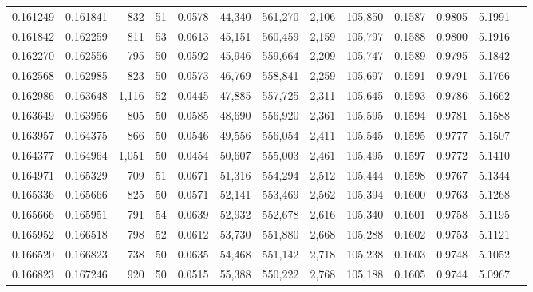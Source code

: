 \begin{tabular}{rrrrrrrrrrrrr}
0.161249 & 0.161841 &   832 &  51 &                                     0.0578 &  44,340 & 561,270 &   2,106 & 105,850 & 0.1587 & 0.9805 & 5.1991 \\
0.161842 & 0.162259 &   811 &  53 &                                     0.0613 &  45,151 & 560,459 &   2,159 & 105,797 & 0.1588 & 0.9800 & 5.1916 \\
0.162270 & 0.162556 &   795 &  50 &                                     0.0592 &  45,946 & 559,664 &   2,209 & 105,747 & 0.1589 & 0.9795 & 5.1842 \\
0.162568 & 0.162985 &   823 &  50 &                                     0.0573 &  46,769 & 558,841 &   2,259 & 105,697 & 0.1591 & 0.9791 & 5.1766 \\
0.162986 & 0.163648 & 1,116 &  52 &                                     0.0445 &  47,885 & 557,725 &   2,311 & 105,645 & 0.1593 & 0.9786 & 5.1662 \\
0.163649 & 0.163956 &   805 &  50 &                                     0.0585 &  48,690 & 556,920 &   2,361 & 105,595 & 0.1594 & 0.9781 & 5.1588 \\
0.163957 & 0.164375 &   866 &  50 &                                     0.0546 &  49,556 & 556,054 &   2,411 & 105,545 & 0.1595 & 0.9777 & 5.1507 \\
0.164377 & 0.164964 & 1,051 &  50 &                                     0.0454 &  50,607 & 555,003 &   2,461 & 105,495 & 0.1597 & 0.9772 & 5.1410 \\
0.164971 & 0.165329 &   709 &  51 &                                     0.0671 &  51,316 & 554,294 &   2,512 & 105,444 & 0.1598 & 0.9767 & 5.1344 \\
0.165336 & 0.165666 &   825 &  50 &                                     0.0571 &  52,141 & 553,469 &   2,562 & 105,394 & 0.1600 & 0.9763 & 5.1268 \\
0.165666 & 0.165951 &   791 &  54 &                                     0.0639 &  52,932 & 552,678 &   2,616 & 105,340 & 0.1601 & 0.9758 & 5.1195 \\
0.165952 & 0.166518 &   798 &  52 &                                     0.0612 &  53,730 & 551,880 &   2,668 & 105,288 & 0.1602 & 0.9753 & 5.1121 \\
0.166520 & 0.166823 &   738 &  50 &                                     0.0635 &  54,468 & 551,142 &   2,718 & 105,238 & 0.1603 & 0.9748 & 5.1052 \\
0.166823 & 0.167246 &   920 &  50 &                                     0.0515 &  55,388 & 550,222 &   2,768 & 105,188 & 0.1605 & 0.9744 & 5.0967 \\

\end{tabular}

